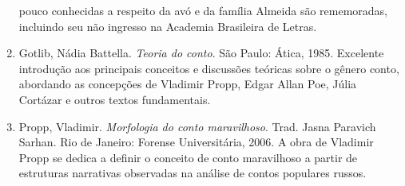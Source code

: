 \documentclass[12pt]{extarticle}
\begin{document}
\begin{enumerate}
  pouco conhecidas a respeito da avó e da família Almeida são
  rememoradas, incluindo seu não ingresso na Academia Brasileira de
  Letras.
\item
  Gotlib, Nádia Battella. \emph{Teoria do conto}. São Paulo: Ática,
  1985. Excelente introdução aos principais conceitos e discussões
  teóricas sobre o gênero conto, abordando as concepções de Vladimir
  Propp, Edgar Allan Poe, Júlia Cortázar e outros textos fundamentais.
\item
  Propp, Vladimir. \emph{Morfologia do conto maravilhoso}. Trad. Jasna
  Paravich Sarhan. Rio de Janeiro: Forense Universitária, 2006. A obra
  de Vladimir Propp se dedica a definir o conceito de conto maravilhoso
  a partir de estruturas narrativas observadas na análise de contos
  populares russos.
\end{enumerate}
\end{document}
